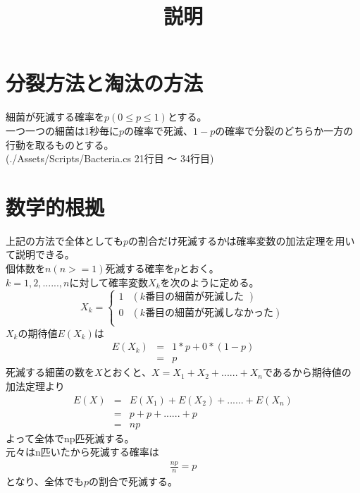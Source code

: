 \documentclass[11pt, oneside]{jarticle}   	%
\title{説明}
\date{}							%
\begin{document}
\maketitle
\section{分裂方法と淘汰の方法}
細菌が死滅する確率を$p(0 \le p \le 1) $とする。\\
一つ一つの細菌は1秒毎に$p$の確率で死滅、$1-p$の確率で分裂のどちらか一方の行動を取るものとする。\\
(./Assets/Scripts/Bacteria.cs 21行目 〜 34行目)\\

\section{数学的根拠}
上記の方法で全体としても$p$の割合だけ死滅するかは確率変数の加法定理を用いて説明できる。\\
個体数を$n(n>=1)$死滅する確率を$p$とおく。\\
$k=1,2, ...... , n$に対して確率変数$X_k$を次のように定める。\\
\[
	X_k = 
	\begin{cases}
		1 & (k\mbox{番目の細菌が死滅した })\\
		0 & (k\mbox{番目の細菌が死滅しなかった})\\
	\end{cases}
\]
$X_k$の期待値$E(X_k)$は\\
\begin{eqnarray*}
	E(X_k) & = & 1 * p + 0 * (1-p)\\
		& = & p
\end{eqnarray*}
死滅する細菌の数を$X$とおくと、$X=X_1 + X_2 + ...... + X_n$であるから期待値の加法定理より
\begin{eqnarray*}
	E(X) & = &  E(X_1) + E(X_2) + ...... + E(X_n)\\
		& = & p + p + ...... + p\\
		& = & np
\end{eqnarray*}
よって全体でnp匹死滅する。\\
元々はn匹いたから死滅する確率は\\
\begin{eqnarray*}
	\frac{np}{n} = p 
\end{eqnarray*}
となり、全体でも$p$の割合で死滅する。
\end{document}
